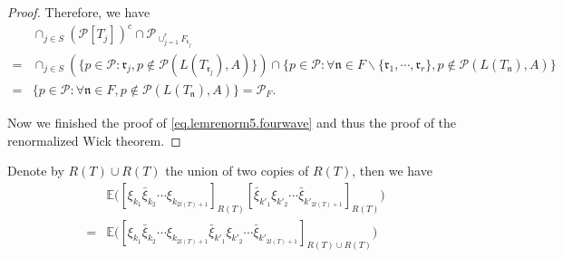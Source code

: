 \begin{proof}
 Therefore, we have
 \begin{equation}
  \begin{split}
  &\cap_{j\in S}(\mathcal{P}[T_j])^c\cap \mathcal{P}_{\cup_{j=1}^r F_{\mathfrak{r}_{j}}}
  \\
  =&\cap_{j\in S} (\{p\in\mathcal{P}:\mathfrak{r}_j,p\notin \mathcal{P}(L(T_{\mathfrak{r}_j}),A)\}) \cap \{p\in\mathcal{P}:\forall \mathfrak{n}\in F\backslash \{\mathfrak{r}_1,\cdots,\mathfrak{r}_r\},p\notin \mathcal{P}(L(T_{\mathfrak{n}}),A)\}
  \\
  = & \{p\in\mathcal{P}:\forall \mathfrak{n}\in F,p\notin \mathcal{P}(L(T_{\mathfrak{n}}),A)\} = \mathcal{P}_F.
  \end{split}
 \end{equation}
 
 
 
 
 
 
 Now we finished the proof of \eqref{eq.lemrenorm5.fourwave} and thus the proof of the renormalized Wick theorem.
 \end{proof}
 
 Denote by $R(T)\cup R(T)$ the union of two copies of $R(T)$, then we have 
 \begin{equation}
  \begin{split}
  &\mathbb{E}\Big([\xi_{k_1}\bar{\xi}_{k_2}\cdots\xi_{k_{2l(T)+1}}]_{R(T)}
  [\bar{\xi}_{k'_1}\xi_{k'_2}\cdots\bar{\xi}_{k'_{2l(T)+1}}]_{R(T)}\Big) 
  \\
  =& \mathbb{E}\Big([\xi_{k_1}\bar{\xi}_{k_2}\cdots\xi_{k_{2l(T)+1}}\bar{\xi}_{k'_1}\xi_{k'_2}\cdots\bar{\xi}_{k'_{2l(T)+1}}]_{R(T)\cup R(T)}\Big)
  \end{split}
 \end{equation}
 
